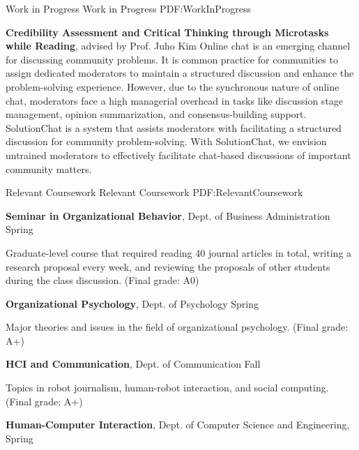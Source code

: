\documentclass[letterpaper,MMMyyyy,nonstopmode]{template}
\begin{document}
\begin{Body}
\endgroup

\BigGap
\SubSection
{Work in Progress}
{Work in Progress}
{PDF:WorkInProgress}

\begingroup
\renewcommand{\MaxNumberedItem}{[88]}

\BigGap
\NumberedItem{[5]}
  \textbf{Credibility Assessment and Critical Thinking through Microtasks while Reading}, advised by Prof. Juho Kim
  \vspace{2mm}\newline
  {\small{
    Online chat is an emerging channel for discussing community problems. It is common practice for communities to assign dedicated moderators to maintain a structured discussion and enhance the problem-solving experience. However, due to the synchronous nature of online chat, moderators face a high managerial overhead in tasks like discussion stage management, opinion summarization, and consensus-building support. SolutionChat is a system that assists moderators with facilitating a structured discussion for community problem-solving.
    With SolutionChat, we envision untrained moderators to effectively facilitate chat-based discussions of important community matters.
  }}

\endgroup


\BigGap
\Section
{Relevant Coursework}
{Relevant Coursework}
{PDF:RelevantCoursework}

\Entry
  \textbf{Seminar in Organizational Behavior},
  Dept. of Business Administration
  \hfill
   Spring

  \Gap
  \BulletItem
    Graduate-level course that required reading 40 journal articles in total, writing a research proposal every week, and reviewing the proposals of other students during the class discussion. (Final grade: A0)

\BigGap
\Entry
  \textbf{Organizational Psychology},
  Dept. of Psychology
  \hfill
   Spring

  \Gap
  \BulletItem
    Major theories and issues in the field of organizational psychology. (Final grade: A+)

\BigGap
\Entry
  \textbf{HCI and Communication},
  Dept. of Communication
  \hfill
   Fall

  \Gap
  \BulletItem
    Topics in robot journalism, human-robot interaction, and social computing. (Final grade: A+)

\BigGap
  \Entry
  \textbf{Human-Computer Interaction},
  Dept. of Computer Science and Engineering,
  \hfill
   Spring


\end{Body}
\end{document}
